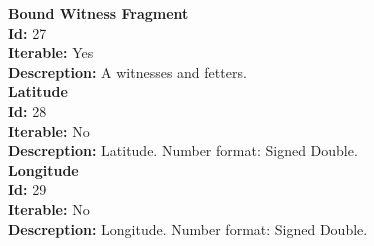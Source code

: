 \documentclass[11pt]{article}
\begin{document}
\noindent
\textbf{Bound Witness Fragment} \\
\indent \textbf{Id:} 27 \\
\indent \textbf{Iterable:} Yes \\
\indent \textbf{Descreption:} A witnesses and fetters. \\

\noindent
\textbf{Latitude} \\
\indent \textbf{Id:} 28 \\
\indent \textbf{Iterable:} No \\
\indent \textbf{Descreption:} Latitude. Number format: Signed Double.\\

\noindent
\textbf{Longitude} \\
\indent \textbf{Id:} 29 \\
\indent \textbf{Iterable:} No \\
\indent \textbf{Descreption:} Longitude. Number format: Signed Double. \\
\end{document}
